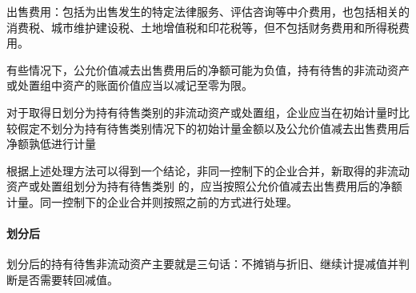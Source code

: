 \documentclass[UTF8,12pt]{ctexart}
\numberwithin{equation}{section} %
\numberwithin{figure}{section}
\numberwithin{table}{section}
\begin{document}
	出售费用：包括为出售发生的特定法律服务、评估咨询等中介费用，也包括相关的消费税、城市维护建设税、土地增值税和印花税等，但不包括财务费用和所得税费用。
	
	有些情况下，公允价值减去出售费用后的净额可能为负值，持有待售的非流动资产或处置组中资产的账面价值应当以减记至零为限。

	对于取得日划分为持有待售类别的非流动资产或处置组，企业应当在初始计量时比较假定不划分为持有待售类别情况下的初始计量金额以及公允价值减去出售费用后净额孰低进行计量
	
	根据上述处理方法可以得到一个结论，非同一控制下的企业合并，新取得的非流动资产或处置组划分为持有待售类别 的，应当按照公允价值减去出售费用后的净额计量。同一控制下的企业合并则按照之前的方式进行处理。
	
	\paragraph{划分后}
	划分后的持有待售非流动资产主要就是三句话：不摊销与折旧、继续计提减值并判断是否需要转回减值。
	
\end{document}
